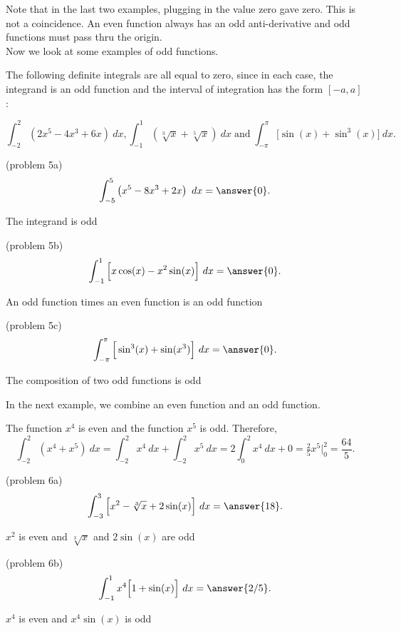 \documentclass[handout]{ximera}
\begin{document}
Note that in the last two examples, plugging in the value zero gave zero.  This is not a coincidence.
An even function always has an odd anti-derivative and odd functions must pass thru the origin.\\
Now we look at some examples of odd functions.

\begin{example}[example 5]
The following definite integrals are all equal to zero, since in each case, the integrand is an odd function and the 
interval of integration has the form $[-a, a]$:

\[\int_{-2}^2 \left(2x^5 - 4x^3 + 6x \right)\ dx, \int_{-1}^1 \left(\sqrt[3] x + \sqrt[5]x\right) \ dx  \; \text{and} \; \int_{-\pi}^\pi \Big[\sin(x) + \sin^3(x)\Big] \ dx.\]
\end{example}

\begin{problem}(problem 5a)
\[\int_{-5}^5 \left(x^5 - 8x^3 +2x \right) \ dx =\answer {0}.\]
\begin{hint}
The integrand is odd
\end{hint}
\end{problem}

\begin{problem}(problem 5b)
\[\int_{-1}^1 \Big[x\cos(x) - x^2\sin(x) \Big] \ dx =\answer {0}.\]
\begin{hint}
An odd function times an even function is an odd function
\end{hint}
\end{problem}

\begin{problem}(problem 5c)
\[\int_{-\pi}^\pi \Big[\sin^3(x) + \sin(x^3)\Big] \ dx =\answer {0}.\]
\begin{hint}
The composition of two odd functions is odd
\end{hint}
\end{problem}


In the next example, we combine an even function and an odd function.

\begin{example}[example 6]
The function $x^4$ is even and the function $x^5$ is odd.  Therefore,
\[\int_{-2}^2 (x^4 + x^5) \ dx = \int_{-2}^2 x^4 \ dx + \int_{-2}^2 x^5 \ dx = 2\int_0^2 x^4 \ dx + 0 = \tfrac{2}{5}x^5\Bigg|_0^2 = \frac{64}{5}.\]
\end{example}

\begin{problem}(problem 6a)
\[\int_{-3}^3 \Big[x^2 - \sqrt[3]x +2\sin(x) \Big] \ dx =\answer {18}.\]
\begin{hint}
$x^2$ is even and $\sqrt[3]x$ and $2\sin(x)$ are odd
\end{hint}
\end{problem}

\begin{problem}(problem 6b)
\[\int_{-1}^{1} x^4\Big[1 + \sin(x)\Big] \ dx =\answer {2/5}.\]
\begin{hint}
$x^4$ is even and $x^4\sin(x)$ is odd
\end{hint}
\end{problem}
\end{document}
